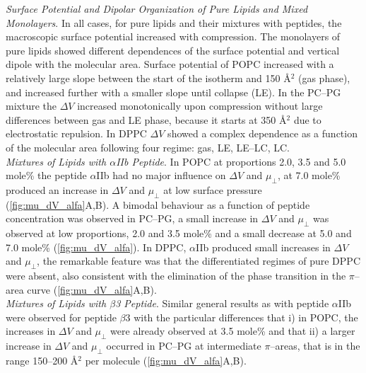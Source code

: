 \documentclass[journal=jacsat,manuscript=article]{achemso}
\begin{document}
\noindent \textit{Surface Potential and Dipolar Organization of Pure Lipids and Mixed Monolayers}. 
In all cases, for pure lipids and their mixtures with peptides, the macroscopic surface potential increased with compression. The monolayers of pure lipids showed different dependences of the surface potential and vertical dipole with the molecular area. Surface potential of POPC increased with a relatively large slope between the start of the isotherm and 150 Å$^2$ (gas phase), and increased further with a smaller slope until collapse (LE). In the PC–PG mixture the $\Delta V$ increased monotonically upon compression without large differences between gas and LE phase, because it starts at 350 Å$^2$ due to electrostatic repulsion. In DPPC $\Delta V$ showed a complex dependence as a function of the molecular area following four regime: gas, LE, LE–LC, LC.\\

\noindent \textit{Mixtures of Lipids with $\alpha$IIb Peptide}. 
 In POPC at proportions 2.0, 3.5 and 5.0 mole\% the peptide $\alpha$IIb had no major influence on $\Delta V$ and $\mu_\perp$, at 7.0 mole\% produced an increase in $\Delta V$ and $\mu_\perp$ at low surface pressure (\autoref{fig:mu_dV_alfa}A,B). A bimodal behaviour as a function of peptide concentration was observed in PC–PG, a small increase in $\Delta V$ and $\mu_\perp$ was observed at low proportions, 2.0 and 3.5 mole\% and a small decrease at 5.0 and 7.0 mole\% (\autoref{fig:mu_dV_alfa}). In DPPC, $\alpha$IIb produced small increases in $\Delta V$ and $\mu_\perp$, the remarkable feature was that the differentiated regimes of pure DPPC were absent, also consistent with the elimination of the phase transition in the $\pi$–area curve (\autoref{fig:mu_dV_alfa}A,B).\\

\noindent \textit{Mixtures of Lipids with $\beta$3 Peptide}.
Similar general results as with peptide $\alpha$IIb were observed for peptide $\beta$3 with the particular differences that i) in POPC, the increases in $\Delta V$ and $\mu_\perp$ were already observed at 3.5 mole\% and that ii) a larger increase in $\Delta V$ and $\mu_\perp$ occurred in PC–PG at intermediate $\pi$–areas, that is in the range 150–200 Å$^2$ per molecule (\autoref{fig:mu_dV_alfa}A,B).
\end{document}
